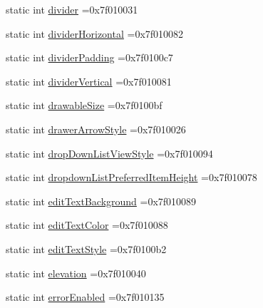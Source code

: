 \begin{DoxyCompactItemize}
\item 
static int \hyperlink{classandroid_1_1support_1_1graphics_1_1drawable_1_1animated_1_1R_1_1attr_a9784b3c983a7069e959fedfd06dd2ba9}{divider} =0x7f010031
\item 
static int \hyperlink{classandroid_1_1support_1_1graphics_1_1drawable_1_1animated_1_1R_1_1attr_a52e3ec70aec5f1fe7011f68dc0ac1449}{divider\+Horizontal} =0x7f010082
\item 
static int \hyperlink{classandroid_1_1support_1_1graphics_1_1drawable_1_1animated_1_1R_1_1attr_a52752c4e819e4372d0886d8f1ef2199d}{divider\+Padding} =0x7f0100c7
\item 
static int \hyperlink{classandroid_1_1support_1_1graphics_1_1drawable_1_1animated_1_1R_1_1attr_aab95d9d8313b9ac9f9b3e98d9b1c67a4}{divider\+Vertical} =0x7f010081
\item 
static int \hyperlink{classandroid_1_1support_1_1graphics_1_1drawable_1_1animated_1_1R_1_1attr_aef6313459cc125b255493e3ee91c72bf}{drawable\+Size} =0x7f0100bf
\item 
static int \hyperlink{classandroid_1_1support_1_1graphics_1_1drawable_1_1animated_1_1R_1_1attr_af767e215000920db40a7dae8855ee31f}{drawer\+Arrow\+Style} =0x7f010026
\item 
static int \hyperlink{classandroid_1_1support_1_1graphics_1_1drawable_1_1animated_1_1R_1_1attr_a921f7b6835d9ed55093112632dcd7b2b}{drop\+Down\+List\+View\+Style} =0x7f010094
\item 
static int \hyperlink{classandroid_1_1support_1_1graphics_1_1drawable_1_1animated_1_1R_1_1attr_a63605f410c43b88afaf4d74ee7357f8d}{dropdown\+List\+Preferred\+Item\+Height} =0x7f010078
\item 
static int \hyperlink{classandroid_1_1support_1_1graphics_1_1drawable_1_1animated_1_1R_1_1attr_a9634ddf34da8327a60d19540fd87e8b5}{edit\+Text\+Background} =0x7f010089
\item 
static int \hyperlink{classandroid_1_1support_1_1graphics_1_1drawable_1_1animated_1_1R_1_1attr_ab015c1b2beb497310275e75a01d4f093}{edit\+Text\+Color} =0x7f010088
\item 
static int \hyperlink{classandroid_1_1support_1_1graphics_1_1drawable_1_1animated_1_1R_1_1attr_aa8f0337dfcf892276a0587aa6d0b191d}{edit\+Text\+Style} =0x7f0100b2
\item 
static int \hyperlink{classandroid_1_1support_1_1graphics_1_1drawable_1_1animated_1_1R_1_1attr_a71fd5f83eeaab303621afb6ec0fd3e80}{elevation} =0x7f010040
\item 
static int \hyperlink{classandroid_1_1support_1_1graphics_1_1drawable_1_1animated_1_1R_1_1attr_af376f663588b39f16243f3c03f9cd4d5}{error\+Enabled} =0x7f010135

\end{DoxyCompactItemize}
